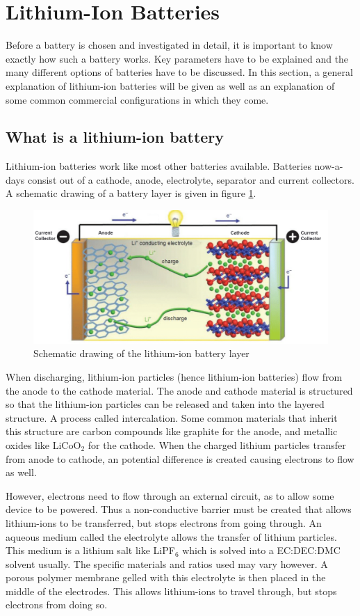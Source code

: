 \section{Lithium-Ion Batteries}
\label{Chap:lithium_ion_batteries}
Before a battery is chosen and investigated in detail, it is important to know exactly how such a battery works. Key parameters have to be explained and the many different options of batteries have to be discussed. In this section, a general explanation of lithium-ion batteries will be given as well as an explanation of some common commercial configurations in which they come.

\subsection{What is a lithium-ion battery}
Lithium-ion batteries work like most other batteries available. Batteries now-a-days consist out of a cathode, anode, electrolyte, separator and current collectors. A schematic drawing of a battery layer is given in figure \ref{Fig:Li-Ion_Schematic}.

\begin{figure} [H]
 	\centering	\includegraphics[width=0.8\linewidth]{Figures/scematic.PNG}
 	\caption{Schematic drawing of the lithium-ion battery layer}
    \label{Fig:Li-Ion_Schematic}
\end{figure}

When discharging, lithium-ion particles (hence lithium-ion batteries) flow from the anode to the cathode material. The anode and cathode material is structured so that the lithium-ion particles can be released and taken into the layered structure. A process called intercalation. Some common materials that inherit this structure are carbon compounds like graphite for the anode, and metallic oxides like LiCoO$_2$ for the cathode. When the charged lithium particles transfer from anode to cathode, an potential difference is created causing electrons to flow as well.

However, electrons need to flow through an external circuit, as to allow some device to be powered. Thus a non-conductive barrier must be created that allows lithium-ions to be transferred, but stops electrons from going through. An aqueous medium called the electrolyte allows the transfer of lithium particles. This medium is a lithium salt like LiPF$_6$ which is solved into a EC:DEC:DMC solvent usually. The specific materials and ratios used may vary however. A porous polymer membrane gelled with this electrolyte is then placed in the middle of the electrodes. This allows lithium-ions to travel through, but stops electrons from doing so.

